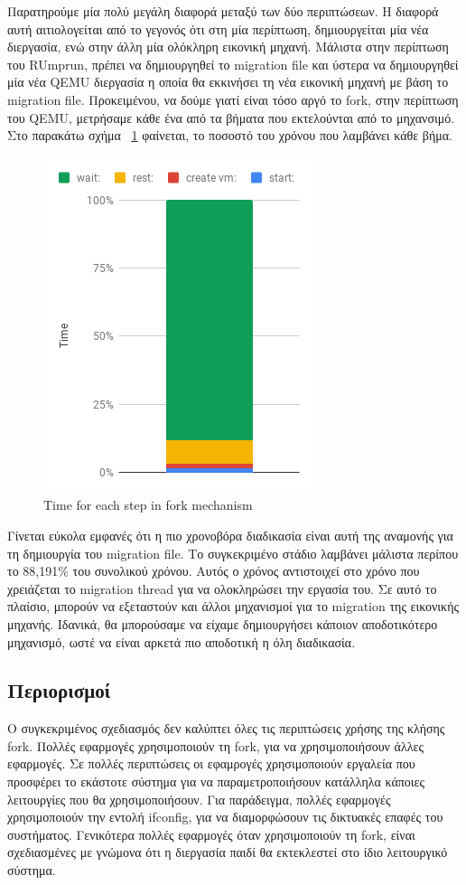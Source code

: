 Παρατηρούμε μία πολύ μεγάλη διαφορά μεταξύ των δύο περιπτώσεων. Η διαφορά αυτή
αιτιολογείται από το γεγονός ότι στη μία περίπτωση, δημιουργείται μία νέα
διεργασία, ενώ στην άλλη μία ολόκληρη εικονική μηχανή. Μάλιστα στην περίπτωση
του RUmprun, πρέπει να δημιουργηθεί το migration file και ύστερα να
δημιουργηθεί μία νέα QEMU διεργασία η οποία θα εκκινήσει τη νέα εικονική μηχανή
με βάση το migration file. Προκειμένου, να δούμε γιατί είναι τόσο αργό το fork,
στην περίπτωση του QEMU, μετρήσαμε κάθε ένα από τα βήματα που εκτελούνται από 
το μηχανσιμό.  Στο παρακάτω σχήμα ~\ref{fig4_12} φαίνεται, το ποσοστό του χρόνου
που λαμβάνει κάθε βήμα. 

\begin{figure}[htp]
\centerline{\includegraphics[scale=0.8]{figures/fork_breakdown.png}}
\caption{Time for each step in fork mechanism\label{fig4_12}}
\end{figure}

Γίνεται εύκολα εμφανές ότι η πιο χρονοβόρα διαδικασία είναι αυτή της αναμονής
για τη δημιουργία του migration file. Το συγκεκριμένο στάδιο λαμβάνει μάλιστα
περίπου το 88,191\% του συνολικού χρόνου. Αυτός ο χρόνος αντιστοιχεί στο χρόνο
που χρειάζεται το migration thread για να ολοκληρώσει την εργασία του. Σε αυτό
το πλαίσιο, μπορούν να εξεταστούν και άλλοι μηχανισμοί για το migration της
εικονικής μηχανής. Ιδανικά, θα μπορούσαμε να είχαμε δημιουργήσει κάποιον
αποδοτικότερο μηχανισμό, ωστέ να είναι αρκετά πιο αποδοτική η όλη διαδικασία.

\subsection{Περιορισμοί}
Ο συγκεκριμένος σχεδιασμός δεν καλύπτει όλες τις περιπτώσεις χρήσης της κλήσης
fork. Πολλές εφαρμογές χρησιμοποιούν τη fork, για να χρησιμοποιήσουν άλλες
εφαρμογές. Σε πολλές περιπτώσεις οι εφαμρογές χρησιμοποιούν εργαλεία που
προσφέρει το εκάστοτε σύστημα για να παραμετροποιήσουν κατάλληλα κάποιες
λειτουργίες που θα χρησιμοποιήσουν. Για παράδειγμα, πολλές εφαρμογές
χρησιμοποιούν την εντολή ifconfig, για να διαμορφώσουν τις δικτυακές επαφές του
συστήματος. Γενικότερα πολλές εφαρμογές όταν χρησιμοποιούν τη fork, είναι
σχεδιασμένες με γνώμονα ότι η διεργασία παιδί θα εκτεκλεστεί στο ίδιο
λειτουργικό σύστημα.

